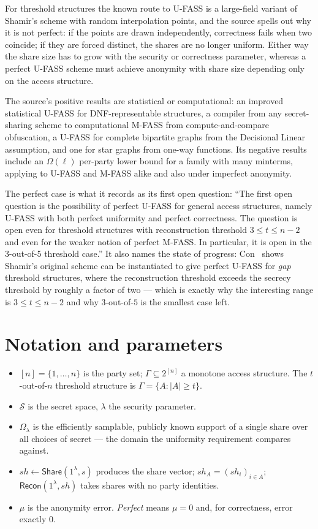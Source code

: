 \documentclass{conjura-conjecture}
\newcommand{\Sh}{\mathcal{S}}
\newcommand{\Om}{\Omega}
\newcommand{\Share}{\mathsf{Share}}
\newcommand{\Recon}{\mathsf{Recon}}
\begin{document}
For threshold structures the known route to U-FASS is a large-field
variant of Shamir's scheme with random interpolation points, and the
source spells out why it is not perfect: if the points are drawn
independently, correctness fails when two coincide; if they are forced
distinct, the shares are no longer uniform. Either way the share size has
to grow with the security or correctness parameter, whereas a perfect
U-FASS scheme must achieve anonymity with share size depending only on
the access structure.

The source's positive results are statistical or computational: an
improved statistical U-FASS for DNF-representable structures, a
compiler from any secret-sharing scheme to computational M-FASS from
compute-and-compare obfuscation, a U-FASS for complete bipartite graphs
from the Decisional Linear assumption, and one for star graphs from
one-way functions. Its negative results include an $\Om(\ell)$ per-party
lower bound for a family with many minterms, applying to U-FASS and
M-FASS alike and also under imperfect anonymity.

The perfect case is what it records as its first open question: ``The
first open question is the possibility of perfect U-FASS for general
access structures, namely U-FASS with both perfect uniformity and perfect
correctness. The question is open even for threshold structures with
reconstruction threshold $3 \le t \le n-2$ and even for the weaker notion
of perfect M-FASS\@. In particular, it is open in the 3-out-of-5 threshold
case.'' It also names the state of progress: Con~\cite{Con24} shows
Shamir's original scheme can be instantiated to give perfect U-FASS for
\emph{gap} threshold structures, where the reconstruction threshold
exceeds the secrecy threshold by roughly a factor of two --- which is
exactly why the interesting range is $3 \le t \le n-2$ and why
$3$-out-of-$5$ is the smallest case left.

\section{Notation and parameters}\label{sec:notation}

\begin{itemize}[nosep]
  \item $[n] = \{1, \dots, n\}$ is the party set; $\Gamma \subseteq
    2^{[n]}$ a monotone access structure. The $t$-out-of-$n$ threshold
    structure is $\Gamma = \{A : |A| \ge t\}$.
  \item $\Sh$ is the secret space, $\lambda$ the security parameter.
  \item $\Omega_{\lambda}$ is the efficiently samplable, publicly known
    support of a single share over all choices of secret --- the domain
    the uniformity requirement compares against.
  \item $sh \leftarrow \Share(1^{\lambda}, s)$ produces the share vector;
    $sh_{A} = (sh_{i})_{i \in A}$; $\Recon(1^{\lambda}, sh)$ takes shares
    with no party identities.
  \item $\mu$ is the anonymity error. \emph{Perfect} means $\mu = 0$ and,
    for correctness, error exactly $0$.
\end{itemize}
\end{document}
